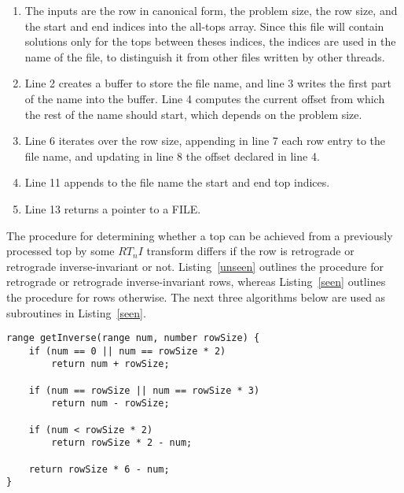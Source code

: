 \begin{enumerate}
\item The inputs are the row in canonical form, the problem size, the row size, and the start and end indices into the all-tops array. Since this file will contain solutions only for the tops between theses indices, the indices are used in the name of the file, to distinguish it from other files written by other threads.
\item Line 2 creates a buffer to store the file name, and line 3 writes the first part of the name into the buffer. Line 4 computes the current offset from which the rest of the name should start, which depends on the problem size.
\addtocounter{enumi}{3}
\item Line 6 iterates over the row size, appending in line 7 each row entry to the file name, and updating in line 8 the offset declared in line 4.
\addtocounter{enumi}{4}
\item Line 11 appends to the file name the start and end top indices.
\addtocounter{enumi}{1}
\item Line 13 returns a pointer to a FILE.
\end{enumerate}

The procedure for determining whether a top can be achieved from a previously processed top by some $RT_nI$ transform differs if the row is retrograde or retrograde inverse-invariant or not. Listing~\ref{unseen} outlines the procedure for retrograde or retrograde inverse-invariant rows, whereas Listing~\ref{seen} outlines the procedure for rows otherwise. The next three algorithms below are used as subroutines in Listing~\ref{seen}.

\begin{lstlisting}[caption={Computing the index of the inverse row within a row class.},label={getInverse}]
range getInverse(range num, number rowSize) {
    if (num == 0 || num == rowSize * 2)
        return num + rowSize;

    if (num == rowSize || num == rowSize * 3)
        return num - rowSize;

    if (num < rowSize * 2)
        return rowSize * 2 - num;

    return rowSize * 6 - num;
}
\end{lstlisting}

